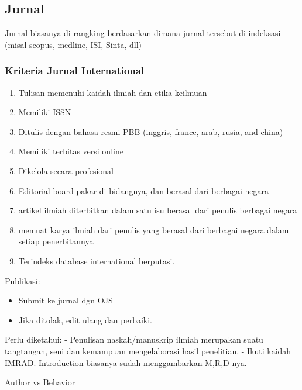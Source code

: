 \documentclass[
  letterpaper,
  DIV=11,
  numbers=noendperiod]{scrreprt}
\providecommand{\tightlist}{%
  \setlength{\itemsep}{0pt}\setlength{\parskip}{0pt}}\usepackage{longtable,booktabs,array}
\begin{document}
\subsection{Jurnal}\label{jurnal}

Jurnal biasanya di rangking berdasarkan dimana jurnal tersebut di
indeksasi (misal scopus, medline, ISI, Sinta, dll)

\subsubsection{Kriteria Jurnal
International}\label{kriteria-jurnal-international}

\begin{enumerate}
\def\labelenumi{\alph{enumi}.}
\tightlist
\item
  Tulisan memenuhi kaidah ilmiah dan etika keilmuan
\item
  Memiliki ISSN
\item
  Ditulis dengan bahasa resmi PBB (inggris, france, arab, rusia, and
  china)
\item
  Memiliki terbitas versi online
\item
  Dikelola secara profesional
\item
  Editorial board pakar di bidangnya, dan berasal dari berbagai negara
\item
  artikel ilmiah diterbitkan dalam satu isu berasal dari penulis
  berbagai negara
\item
  memuat karya ilmiah dari penulis yang berasal dari berbagai negara
  dalam setiap penerbitannya
\item
  Terindeks database international berputasi.
\end{enumerate}

Publikasi:

\begin{itemize}
\tightlist
\item
  Submit ke jurnal dgn OJS
\item
  Jika ditolak, edit ulang dan perbaiki.
\end{itemize}

Perlu diketahui: - Penulisan naskah/manuskrip ilmiah merupakan suatu
tangtangan, seni dan kemampuan mengelaborasi hasil penelitian. - Ikuti
kaidah IMRAD. Introduction biasanya sudah menggambarkan M,R,D nya.

Author vs Behavior
\end{document}
